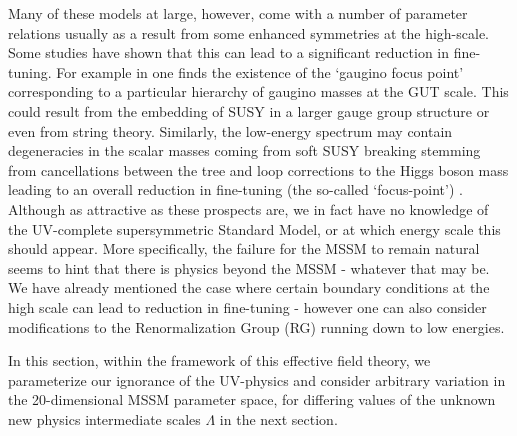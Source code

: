 Many of these models at large, however, come with a number of parameter relations usually as a result from some enhanced symmetries at the high-scale. Some studies have shown that this can lead to a significant reduction in fine-tuning. For example in \cite{RN716,RN712,RN749,RN750,RN751,RN752} one finds the existence of the `gaugino focus point' corresponding to a particular hierarchy of gaugino masses at the GUT scale. This could result from the embedding of SUSY in a larger gauge group structure or even from string theory. Similarly, the low-energy spectrum may contain degeneracies in the scalar masses coming from soft SUSY breaking stemming from cancellations between the tree and loop corrections to the Higgs boson mass leading to an overall reduction in fine-tuning (the so-called `focus-point') \cite{RN90,RN704,RN753,RN754,RN755}. Although as attractive as these prospects are, we in fact have no knowledge of the UV-complete supersymmetric Standard Model, or at which energy scale this should appear. More specifically, the failure for the MSSM to remain natural seems to hint that there is physics beyond the MSSM - whatever that may be. We have already mentioned the case where certain boundary conditions at the high scale can lead to reduction in fine-tuning - however one can also consider modifications to the Renormalization Group (RG) running down to low energies.

In this section, within the framework of this effective field theory, we parameterize our ignorance of the UV-physics and consider arbitrary variation in the 20-dimensional MSSM parameter space, for differing values of the unknown new physics intermediate scales $\Lambda$ in the next section. 

